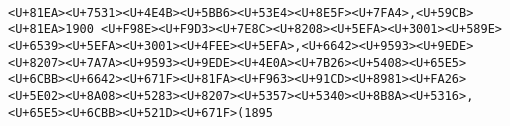 \documentclass[
]{article}
\begin{document}
\begin{verbatim}
                                                                                                                                                                                                                                                                                                                                                                                                                                                                                                                                                                                                                                                                                                                                                                                                                                                                                                                                                                                                                                                                                                                                                                                                                                                                                                                                                                                                                                                                                                                                                                                                                                                                                                                                                                                                                                                                                                                                                                                                                                                                                                                                                                                                                                                                                                                                 <U+81EA><U+7531><U+4E4B><U+5BB6><U+53E4><U+8E5F><U+7FA4>,<U+59CB><U+81EA>1900 <U+F98E><U+F9D3><U+7E8C><U+8208><U+5EFA><U+3001><U+589E><U+6539><U+5EFA><U+3001><U+4FEE><U+5EFA>,<U+6642><U+9593><U+9EDE><U+8207><U+7A7A><U+9593><U+9EDE><U+4E0A><U+7B26><U+5408><U+65E5><U+6CBB><U+6642><U+671F><U+81FA><U+F963><U+91CD><U+8981><U+FA26><U+5E02><U+8A08><U+5283><U+8207><U+5357><U+5340><U+8B8A><U+5316>,<U+65E5><U+6CBB><U+521D><U+671F>(1895 
\end{verbatim}
\end{document}
